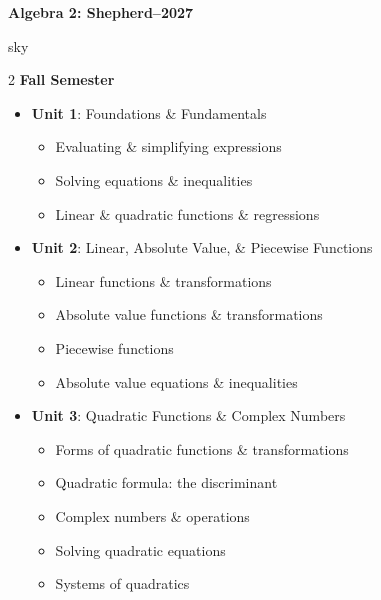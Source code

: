 \documentclass[10pt]{article}
\newcommand{\CourseName}{Algebra 2: Shepherd}
\newcommand{\SchoolYear}{2026--2027}
\begin{document}
    \begin{center}
        {\Large\bfseries \CourseName \quad \SchoolYear}
    \end{center}

    \renewcommand{\arraystretch}{1.6}
    \begin{skillbox}{sky}
        \setlength{\parskip}{0.6em}
        \setlength{\parindent}{0pt}
        \setlength{\columnsep}{1cm}
        \begin{multicols}{2}
            \raggedcolumns
            \textbf{Fall Semester}
            \begin{itemize}
                \item \textbf{Unit 1}:  Foundations \& Fundamentals
                \begin{itemize}
                    \item Evaluating \& simplifying expressions
                    \item Solving equations \& inequalities
                    \item Linear \& quadratic functions \& regressions
                \end{itemize}
                \item \textbf{Unit 2}:  Linear, Absolute Value, \& Piecewise Functions
                \begin{itemize}
                    \item Linear functions \& transformations
                    \item Absolute value functions \& transformations
                    \item Piecewise functions
                    \item Absolute value equations \& inequalities
                \end{itemize}
                \item \textbf{Unit 3}:  Quadratic Functions \& Complex Numbers
                \begin{itemize}
                    \item Forms of quadratic functions \& transformations
                    \item Quadratic formula: the discriminant
                    \item Complex numbers \& operations
                    \item Solving quadratic equations
                    \item Systems of quadratics
                \end{itemize}

\end{itemize}
\end{multicols}
\end{skillbox}
\end{document}
